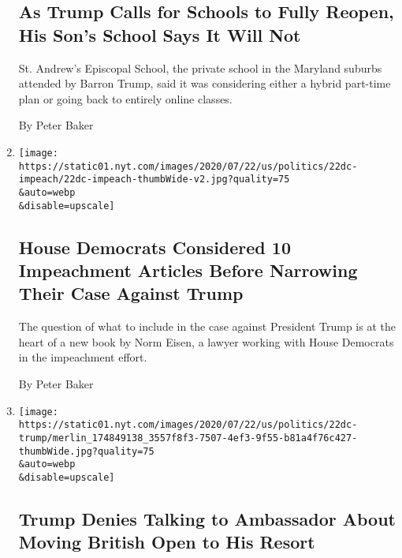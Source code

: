 \begin{enumerate}
  \hypertarget{as-trump-calls-for-schools-to-fully-reopen-his-sons-school-says-it-will-not}{%
  \subsection{As Trump Calls for Schools to Fully Reopen, His Son's
  School Says It Will
  Not}\label{as-trump-calls-for-schools-to-fully-reopen-his-sons-school-says-it-will-not}}

  St. Andrew's Episcopal School, the private school in the Maryland
  suburbs attended by Barron Trump, said it was considering either a
  hybrid part-time plan or going back to entirely online classes.

  By Peter Baker
\item
  \href{/2020/07/22/us/politics/trump-impeachment.html}{}

  \texttt{[image: https://static01.nyt.com/images/2020/07/22/us/politics/22dc-impeach/22dc-impeach-thumbWide-v2.jpg?quality=75\\\&auto=webp\\\&disable=upscale]}

  \hypertarget{house-democrats-considered-10-impeachment-articles-before-narrowing-their-case-against-trump}{%
  \subsection{House Democrats Considered 10 Impeachment Articles Before
  Narrowing Their Case Against
  Trump}\label{house-democrats-considered-10-impeachment-articles-before-narrowing-their-case-against-trump}}

  The question of what to include in the case against President Trump is
  at the heart of a new book by Norm Eisen, a lawyer working with House
  Democrats in the impeachment effort.

  By Peter Baker
\item
  \href{/2020/07/22/us/politics/trump-turnberry-british-open.html}{}

  \texttt{[image: https://static01.nyt.com/images/2020/07/22/us/politics/22dc-trump/merlin\_174849138\_3557f8f3-7507-4ef3-9f55-b81a4f76c427-thumbWide.jpg?quality=75\\\&auto=webp\\\&disable=upscale]}

  \hypertarget{trump-denies-talking-to-ambassador-about-moving-british-open-to-his-resort}{%
  \subsection{Trump Denies Talking to Ambassador About Moving British
  Open to His
  Resort}\label{trump-denies-talking-to-ambassador-about-moving-british-open-to-his-resort}}


\end{enumerate}
